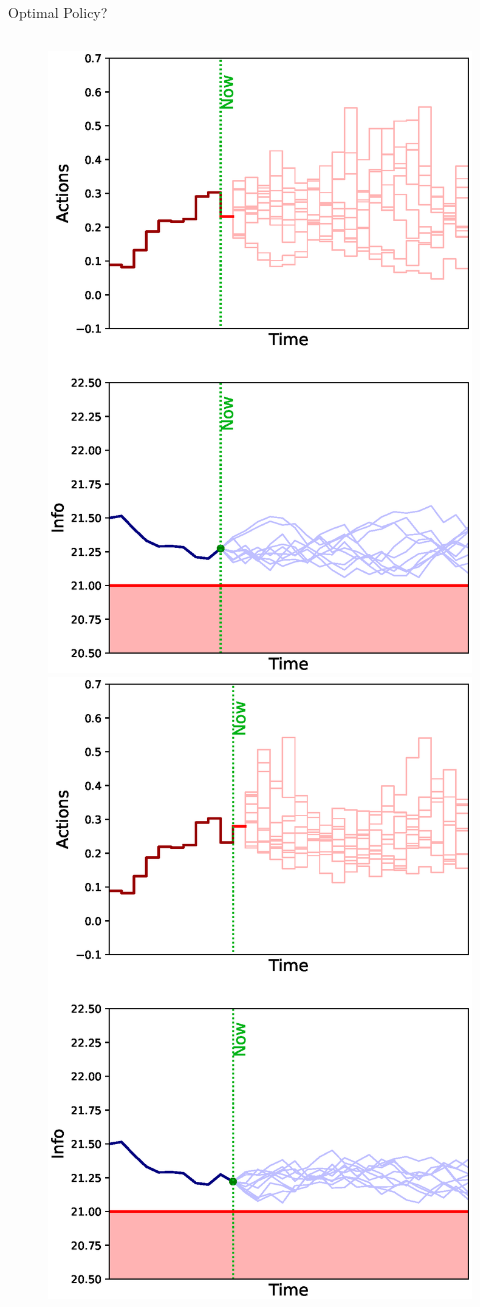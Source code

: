 \documentclass[lecture]{beamer}
\begin{document}
\begin{frame}{\normalsize Optimal Policy?}
\begin{columns}[t]
{\begin{overlayarea}{\textwidth}{0.8\textheight}
\begin{figure}
{        }%
        {%
          \includegraphics[width=.8\textwidth]{Codes/Basics/Policy9.eps}%
        }%
        {%
          \includegraphics[width=.8\textwidth]{Codes/Basics/Policy10.eps}%
}
\end{figure}
\end{overlayarea}}
\end{columns}
\end{frame}
\end{document}
